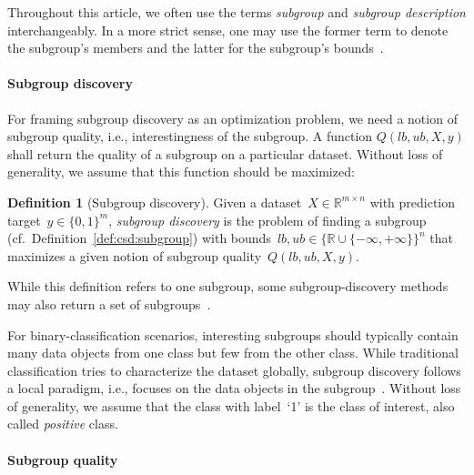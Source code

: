\documentclass{article}
\theoremstyle{definition}
\newtheorem{definition}{Definition}
\begin{document}
Throughout this article, we often use the terms \emph{subgroup} and \emph{subgroup description} interchangeably.
In a more strict sense, one may use the former term to denote the subgroup's members and the latter for the subgroup's bounds~\cite{atzmueller2015subgroup}.

\paragraph{Subgroup discovery}

For framing subgroup discovery as an optimization problem, we need a notion of subgroup quality, i.e., interestingness of the subgroup.
A function $Q(\mathit{lb}, \mathit{ub}, X, y)$ shall return the quality of a subgroup on a particular dataset.
Without loss of generality, we assume that this function should be maximized:
%
\begin{definition}[Subgroup discovery]
	Given a dataset~$X \in \mathbb{R}^{m \times n}$ with prediction target~$y \in \{0, 1\}^m$,
	\emph{subgroup discovery} is the problem of finding a subgroup (cf.~Definition~\ref{def:csd:subgroup}) with bounds~$\mathit{lb}, \mathit{ub} \in \{\mathbb{R} \cup \{-\infty, +\infty\}\}^n$ that maximizes a given notion of subgroup quality~$Q(\mathit{lb}, \mathit{ub}, X, y)$.
	\label{def:csd:subgroup-discovery}
\end{definition}
%
While this definition refers to one subgroup, some subgroup-discovery methods may also return a set of subgroups~\cite{atzmueller2015subgroup}.

For binary-classification scenarios, interesting subgroups should typically contain many data objects from one class but few from the other class.
While traditional classification tries to characterize the dataset globally, subgroup discovery follows a local paradigm, i.e., focuses on the data objects in the subgroup~\cite{meeng2021real}.
Without loss of generality, we assume that the class with label~`1' is the class of interest, also called \emph{positive} class.

\paragraph{Subgroup quality}
\end{document}
